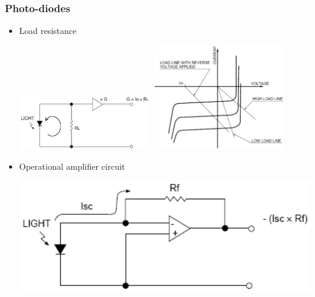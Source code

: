 \documentclass[11pt]{article}
\begin{document}
\subsubsection{Photo-diodes}
\label{sec:orgb95a94f}
\begin{itemize}
\item Load resistance
\begin{center}
\includegraphics[width=0.45\textwidth]{./images/photo-diode-load-resistance-circuit.png}
\includegraphics[width=0.45\textwidth]{./images/photo-diode-load-resistance-graph.png}
\end{center}
\item Operational amplifier circuit
\begin{center}
\includegraphics[width=.9\linewidth]{./images/photo-diode-op-amp-circuit.png}
\end{center}
\end{itemize}

 \newpage
\end{document}
